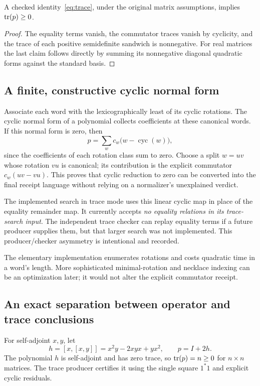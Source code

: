 \begin{theorem}
A checked identity~\eqref{eq:trace}, under the original matrix assumptions,
implies $\operatorname{tr}(p)\ge0$.
\end{theorem}
\begin{proof}
The equality terms vanish, the commutator traces vanish by cyclicity, and the
trace of each positive semidefinite sandwich is nonnegative. For real matrices
the last claim follows directly by summing its nonnegative diagonal quadratic
forms against the standard basis.
\end{proof}

\subsection{A finite, constructive cyclic normal form}

Associate each word with the lexicographically least of its cyclic rotations.
The cyclic normal form of a polynomial collects coefficients at these canonical
words. If this normal form is zero, then
\[
 p=\sum_w c_w\bigl(w-\operatorname{cyc}(w)\bigr),
\]
since the coefficients of each rotation class sum to zero. Choose a split
$w=uv$ whose rotation $vu$ is canonical; its contribution is the explicit
commutator $c_w(uv-vu)$. This proves that cyclic reduction to zero can be
converted into the final receipt language without relying on a normalizer's
unexplained verdict.

The implemented search in trace mode uses this linear cyclic map in place of
the equality remainder map. It currently accepts \emph{no equality relations
in its trace-search input}. The independent trace checker can replay equality
terms if a future producer supplies them, but that larger search was not
implemented. This producer/checker asymmetry is intentional and recorded.

The elementary implementation enumerates rotations and costs quadratic time in
a word's length. More sophisticated minimal-rotation and necklace indexing can
be an optimization later; it would not alter the explicit commutator receipt.

\subsection{An exact separation between operator and trace conclusions}

For self-adjoint $x,y$, let
\[
 h=[x,[x,y]]=x^2y-2xyx+yx^2,\qquad p=I+2h.
\]
The polynomial $h$ is self-adjoint and has zero trace, so $\operatorname{tr}(p)=n\ge0$ for
$n\times n$ matrices. The trace producer certifies it using the single square
$1^*1$ and explicit cyclic residuals.

